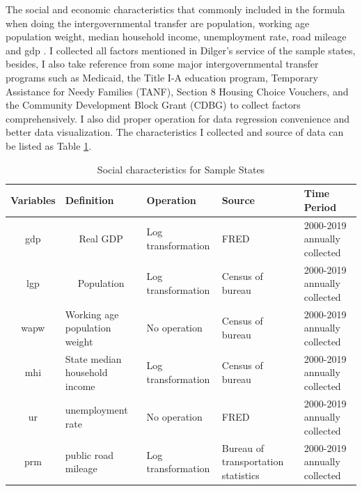 The social and economic characteristics that commonly included in the formula when doing the intergovernmental transfer are population, working age population weight, median household income, unemployment rate, road mileage and gdp \cite{dilger2015federal}. I collected all factors mentioned in Dilger's service\cite{dilger2015federal} of the sample states, besides, I also take reference from some major intergovernmental transfer programs such as Medicaid, the Title I-A education program, Temporary Assistance for Needy Families (TANF), Section 8 Housing Choice Vouchers, and the Community Development Block Grant (CDBG) to collect factors comprehensively. I also did proper operation for data regression convenience and better data visualization. The characteristics I collected and source of data can be listed as Table \ref*{Table 2.4}.

\begin{table}[H]
    \centering
    \caption{Social characteristics for Sample States}
    \begin{tabular}{cp{6.43em}p{9.285em}p{5.855em}p{5.355em}}
        \toprule
        \multicolumn{1}{p{4em}}{Variables } & Definition                      & Operation          & Source                              & Time Period                  \\
        \midrule
        gdp                                 & \multicolumn{1}{c}{Real GDP}    & Log transformation & FRED                                & 2000-2019 annually collected \\
        \midrule
        lgp                                 & \multicolumn{1}{c}{Population } & Log transformation & Census of bureau                    & 2000-2019 annually collected \\
        \midrule
        wapw                                & Working age population weight   & No operation       & Census of bureau                    & 2000-2019 annually collected \\
        \midrule
        mhi                                 & State median household income   & Log transformation & Census of bureau                    & 2000-2019 annually collected \\
        \midrule
        ur                                  & unemployment rate               & No operation       & FRED                                & 2000-2019 annually collected \\
        \midrule
        prm                                 & public road mileage             & Log transformation & Bureau of transportation statistics & 2000-2019 annually collected \\
        \bottomrule
    \end{tabular}%
    \label{Table 2.4}%
\end{table}%


